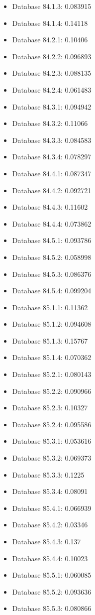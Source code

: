 \begin{itemize}
\item Database 84.1.3: 0.083915
\item Database 84.1.4: 0.14118
\item Database 84.2.1: 0.10406
\item Database 84.2.2: 0.096893
\item Database 84.2.3: 0.088135
\item Database 84.2.4: 0.061483
\item Database 84.3.1: 0.094942
\item Database 84.3.2: 0.11066
\item Database 84.3.3: 0.084583
\item Database 84.3.4: 0.078297
\item Database 84.4.1: 0.087347
\item Database 84.4.2: 0.092721
\item Database 84.4.3: 0.11602
\item Database 84.4.4: 0.073862
\item Database 84.5.1: 0.093786
\item Database 84.5.2: 0.058998
\item Database 84.5.3: 0.086376
\item Database 84.5.4: 0.099204
\item Database 85.1.1: 0.11362
\item Database 85.1.2: 0.094608
\item Database 85.1.3: 0.15767
\item Database 85.1.4: 0.070362
\item Database 85.2.1: 0.080143
\item Database 85.2.2: 0.090966
\item Database 85.2.3: 0.10327
\item Database 85.2.4: 0.095586
\item Database 85.3.1: 0.053616
\item Database 85.3.2: 0.069373
\item Database 85.3.3: 0.1225
\item Database 85.3.4: 0.08091
\item Database 85.4.1: 0.066939
\item Database 85.4.2: 0.03346
\item Database 85.4.3: 0.137
\item Database 85.4.4: 0.10023
\item Database 85.5.1: 0.060085
\item Database 85.5.2: 0.093636
\item Database 85.5.3: 0.080866

\end{itemize}
